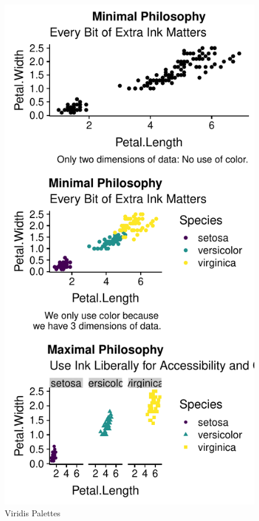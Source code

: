 \documentclass[]{article}
\begin{document}
\begin{figure}
\centering
\includegraphics{design_files/figure-latex/unnamed-chunk-8-1.pdf}
\caption{Viridis Palettes}
\end{figure}
\end{document}

